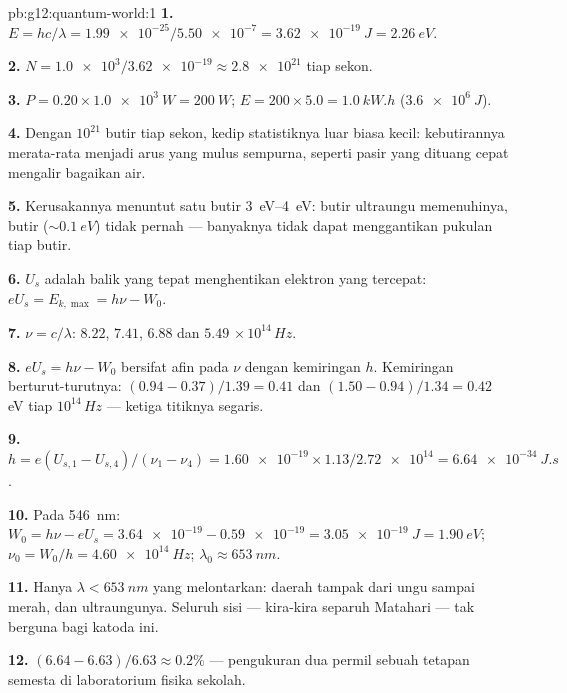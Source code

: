 \begin{solution}{pb:g12:quantum-world:1}
\textbf{1.} $E = hc/\lambda = \num{1.99e-25}/\num{5.50e-7} =
\qty{3.62e-19}{J} = \qty{2.26}{eV}$.

\textbf{2.} $N = \num{1.0e3}/\num{3.62e-19} \approx \num{2.8e21}$
 tiap sekon.

\textbf{3.} $P = 0.20 \times \qty{1.0e3}{W} = \qty{200}{W}$;
$E = 200 \times 5.0 = \qty{1.0}{kW.h}$ ($\qty{3.6e6}{J}$).

\textbf{4.} Dengan $10^{21}$ butir tiap sekon, kedip statistiknya
luar biasa kecil: kebutirannya merata-rata menjadi arus yang mulus
sempurna, seperti pasir yang dituang cepat mengalir bagaikan air.

\textbf{5.} Kerusakannya menuntut satu butir \qtyrange{3}{4}{eV}: butir ultraungu
memenuhinya, butir  ($\sim \qty{0.1}{eV}$) tidak pernah ---
banyaknya tidak dapat menggantikan pukulan tiap butir.

\textbf{6.} $U_s$ adalah  balik yang tepat menghentikan elektron
yang tercepat: $eU_s = E_{k,\max} = h\nu - W_0$.

\textbf{7.} $\nu = c/\lambda$: $8.22$, $7.41$, $6.88$ dan $5.49$
$\times\,10^{14}\,\unit{Hz}$.

\textbf{8.} $eU_s = h\nu - W_0$ bersifat afin pada $\nu$ dengan kemiringan $h$.
Kemiringan berturut-turutnya: $(0.94 - 0.37)/1.39 = 0.41$ dan
$(1.50 - 0.94)/1.34 = 0.42$ \unit{eV} tiap $10^{14}\,\unit{Hz}$ ---
ketiga titiknya segaris.

\textbf{9.} $h = e(U_{s,1}-U_{s,4})/(\nu_1-\nu_4) = \num{1.60e-19}
\times 1.13/\num{2.72e14} = \qty{6.64e-34}{J.s}$.

\textbf{10.} Pada \qty{546}{nm}: $W_0 = h\nu - eU_s = \num{3.64e-19} -
\num{0.59e-19} = \qty{3.05e-19}{J} = \qty{1.90}{eV}$;
$\nu_0 = W_0/h = \qty{4.60e14}{Hz}$; $\lambda_0 \approx \qty{653}{nm}$.

\textbf{11.} Hanya $\lambda < \qty{653}{nm}$ yang melontarkan: daerah tampak dari
ungu sampai merah, dan ultraungunya. Seluruh sisi  --- kira-kira separuh
 Matahari --- tak berguna bagi katoda ini.

\textbf{12.} $(6.64 - 6.63)/6.63 \approx 0.2\%$ --- pengukuran dua
permil sebuah tetapan semesta di laboratorium fisika sekolah.


\end{solution}
